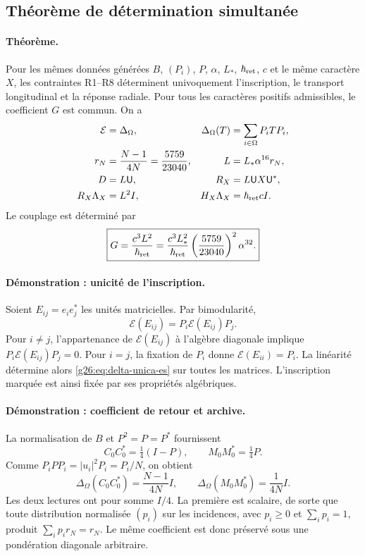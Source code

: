 \subsection{Théorème de détermination simultanée}

\paragraph{Théorème.}
Pour les mêmes données générées \(B\), \((P_i)\), \(P\),
\(\alpha\), \(L_*\), \(\hbar_{\rm ret}\), \(c\) et le même caractère
\(X\), les contraintes R1--R8 déterminent univoquement l'inscription,
le transport longitudinal et la réponse radiale. Pour tous les
caractères positifs admissibles, le coefficient \(G\) est commun. On a
\begin{align}
 \mathcal E&=\Delta_\Omega,
 &\Delta_\Omega(T)&=\sum_{i\in\Omega}P_iTP_i,\label{g26:eq:delta-unica-es}\\
 r_N&=\frac{N-1}{4N}=\frac{5759}{23040},
 &L&=L_*\alpha^{16}r_N,\label{g26:eq:longitud-unica-es}\\
 D&=L\mathsf U,
 &R_X&=L\mathsf U X\mathsf U^*,\label{g26:eq:radial-unica-es}\\
 R_X\Lambda_X&=L^2I,
 &H_X\Lambda_X&=\hbar_{\rm ret}cI.\label{g26:eq:productos-radiales-es}
\end{align}
Le couplage est déterminé par
\begin{equation}
 \boxed{G=\frac{c^3L^2}{\hbar_{\rm ret}}
 =\frac{c^3L_*^2}{\hbar_{\rm ret}}
   \left(\frac{5759}{23040}\right)^2\alpha^{32}.}
 \label{g26:eq:g-rigido-es}
\end{equation}

\paragraph{Démonstration : unicité de l'inscription.}
Soient \(E_{ij}=e_ie_j^*\) les unités matricielles. Par bimodularité,
\[
 \mathcal E(E_{ij})=P_i\mathcal E(E_{ij})P_j.
\]
Pour \(i\ne j\), l'appartenance de \(\mathcal E(E_{ij})\) à l'algèbre diagonale implique \(P_i\mathcal E(E_{ij})P_j=0\). Pour \(i=j\), la fixation de \(P_i\) donne \(\mathcal E(E_{ii})=P_i\). La linéarité détermine alors \eqref{g26:eq:delta-unica-es} sur toutes les matrices. L'inscription marquée est ainsi fixée par ses propriétés algébriques.

\paragraph{Démonstration : coefficient de retour et archive.}
La normalisation de \(B\) et \(P^2=P=P^*\) fournissent
\[
 C_0C_0^*=\tfrac14(I-P),\qquad M_0M_0^*=\tfrac14P.
\]
Comme \(P_iPP_i=|u_i|^2P_i=P_i/N\), on obtient
\begin{equation}
 \Delta_\Omega(C_0C_0^*)=\frac{N-1}{4N}I,
 \qquad
 \Delta_\Omega(M_0M_0^*)=\frac{1}{4N}I.
 \label{g26:eq:retorno-y-memoria-es}
\end{equation}
Les deux lectures ont pour somme \(I/4\). La première est scalaire, de sorte que
toute distribution normalisée \((p_i)\) sur les incidences,
avec \(p_i\geq0\) et \(\sum_i p_i=1\), produit
\(\sum_i p_i r_N=r_N\). Le même coefficient est donc préservé
sous une pondération diagonale arbitraire.

